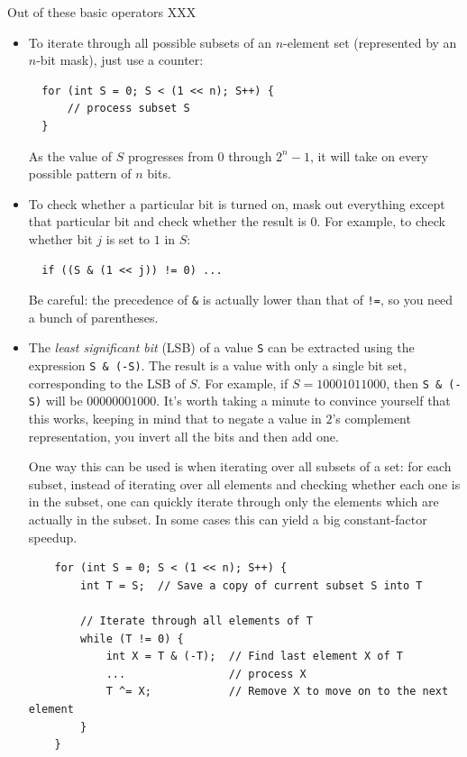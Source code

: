 \documentclass[10pt]{book}
\begin{document}
Out of these basic operators XXX

\begin{itemize}
\item To iterate through all possible subsets of an $n$-element set
  (represented by an $n$-bit mask), just use a counter:
\begin{verbatim}
  for (int S = 0; S < (1 << n); S++) {
      // process subset S
  }
\end{verbatim}
As the value of $S$ progresses from $0$ through $2^n - 1$, it will
take on every possible pattern of $n$ bits.

\item To check whether a particular bit is turned on, mask out
  everything except that particular bit and check whether the result
  is $0$.  For example, to check whether bit $j$ is set to $1$ in $S$:
\begin{verbatim}
  if ((S & (1 << j)) != 0) ...
\end{verbatim}
  Be careful: the precedence of \verb|&| is actually lower than that of
  \verb|!=|, so you need a bunch of parentheses.

\item The \emph{least significant bit} (LSB) of a value \texttt{S} can
  be extracted using the expression \verb|S & (-S)|.  The result is a
  value with only a single bit set, corresponding to the LSB of $S$.
  For example, if $S = 10001011000$, then \verb|S & (-S)| will be
  $00000001000$.  It's worth taking a minute to convince yourself that
  this works, keeping in mind that to negate a value in $2$'s
  complement representation, you invert all the bits and then add one.

  One way this can be used is when iterating over all subsets of a
  set: for each subset, instead of iterating over all elements and
  checking whether each one is in the subset, one can quickly iterate
  through only the elements which are actually in the subset.  In some
  cases this can yield a big constant-factor speedup.
  \begin{verbatim}
    for (int S = 0; S < (1 << n); S++) {
        int T = S;  // Save a copy of current subset S into T

        // Iterate through all elements of T
        while (T != 0) {
            int X = T & (-T);  // Find last element X of T
            ...                // process X
            T ^= X;            // Remove X to move on to the next element
        }
    }
  \end{verbatim}


\end{itemize}
\end{document}
